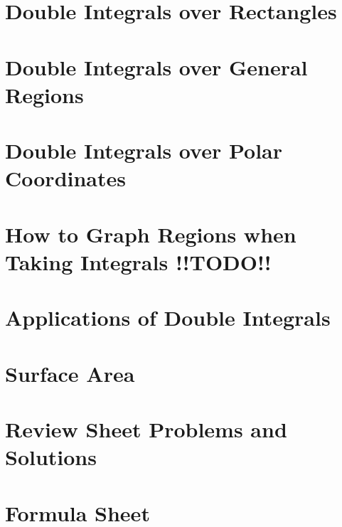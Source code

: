 \documentclass{article}
\begin{document}
\newpage
\section{Double Integrals over Rectangles}

\newpage
\section{Double Integrals over General Regions}

\newpage
\section{Double Integrals over Polar Coordinates}

\newpage
\section{How to Graph Regions when Taking Integrals !!TODO!!}

\newpage
\section{Applications of Double Integrals}

\newpage
\section{Surface Area}

\newpage
\section{Review Sheet Problems and Solutions}

\newpage
\section{Formula Sheet}
\end{document}
